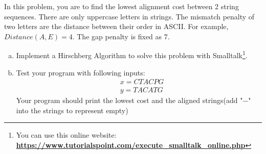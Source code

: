 \documentclass{article}
\begin{document}
In this problem, you are to find the lowest alignment cost between 2 string sequences. There are only uppercase letters in strings. The mismatch penalty of two letters are the distance between their order in ASCII. For example, $Distance(A, E) = 4$. The gap penalty is fixed as $7$. 
\begin{enumerate}[a)]
\item Implement a Hirschberg Algorithm to solve this problem with Smalltalk\footnote{You can use this online website: \href{https://www.tutorialspoint.com/execute_smalltalk_online.php}{\textbf{https://www.tutorialspoint.com/execute\_smalltalk\_online.php}}}.

\item Test your program with following inputs:
\begin{align*}
    &x=CTACPG\\
    &y=TACATG
\end{align*}
Your program should print the lowest cost and the aligned strings(add "$-$" into the strings to represent empty)
\end{enumerate}
\end{document}
